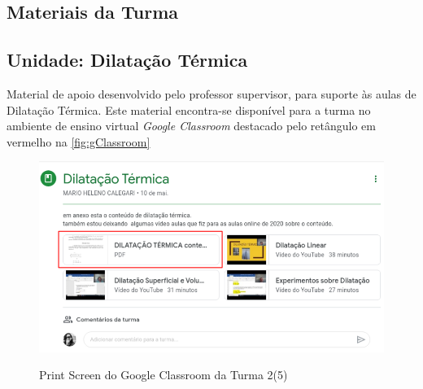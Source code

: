 \begin{anexosenv}     
    \chapter{Materiais da Turma}
    \thispagestyle{empty}
    \label{anx:materiaisAnexo}
    
    \section{Unidade: Dilatação Térmica}
    \label{anx:materialAnexoDilatacaoTermica}
    Material de apoio desenvolvido pelo professor supervisor, para suporte às aulas de Dilatação Térmica. Este material encontra-se disponível para a turma no ambiente de ensino virtual \emph{Google Classroom} destacado pelo retângulo em vermelho na \autoref{fig:gClassroom}
    \vspace{1cm}
    \begin{figure}[!h]
        \centering
        \footnotesize        
        \caption{Print Screen do Google Classroom da Turma 2(5)}
        \includegraphics[width=\textwidth]{03-elementos/03.2_textual/03.2.1_fig/google-class01.png}
        \label{fig:gClassroom}
    \end{figure}


\end{anexosenv}
